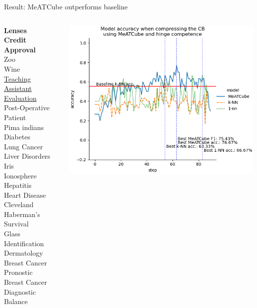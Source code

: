 \documentclass[]{beamer}
\begin{document}
\begin{frame}{Result: MeATCube outperforms baseline}
    \begin{columns}
        \begin{column}{.35\textwidth}
            {\smaller\smaller
            \textbf{Lenses} \\
            \textbf{Credit Approval} \\
            Zoo \\
            Wine \\
            \underline{Teaching Assistant Evaluation} \\
            Post-Operative Patient \\
            Pima indians Diabetes \\
            Lung Cancer \\
            Liver Disorders \\
            Iris \\
            Ionosphere \\
            Hepatitis \\
            Heart Disease Cleveland \\
            Haberman's Survival \\
            Glass Identification \\
            Dermatology \\
            Breast Cancer Pronostic \\
            Breast Cancer Diagnostic \\
            Balance\\
            ~}
        \end{column}
        \begin{column}{.65\textwidth}
            \includegraphics[width=.8\textwidth]{../results/figs/kaggle+teaching+assistant+evaluation.png}

\end{column}
\end{columns}
\end{frame}
\end{document}
